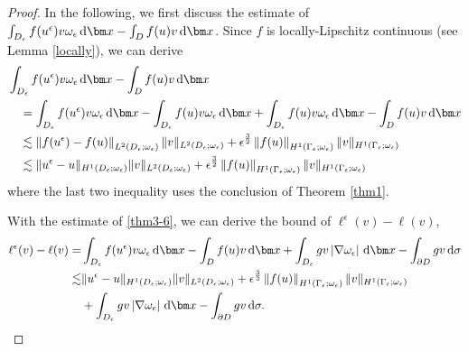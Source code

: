 \documentclass[3p,times]{elsarticle}
\numberwithin{equation}{section}
\newcommand{\dd}{\,{\rm d}}
\begin{document}
\begin{proof}
	In the following, we first discuss the estimate of $\int_{D_{\epsilon}}f(u^{\epsilon})v\omega_{\epsilon}\dd\bm x-\int_D f(u)v\dd\bm x$. Since $f$ is locally-Lipschitz continuous (see Lemma \ref{locally}), we can derive
	\begin{equation}
		\label{thm3-6}
		\begin{aligned}
			&\int_{D_{\epsilon}} f(u^{\epsilon})v\omega_{\epsilon}\dd\bm x - \int_D f(u)v\dd\bm x\\
			&\quad=\int_{D_{\epsilon}} f(u^{\epsilon})v\omega_{\epsilon}\dd\bm x-\int_{D_{\epsilon}} f(u)v\omega_{\epsilon}\dd\bm x+\int_{D_{\epsilon}}f(u)v\omega_{\epsilon}\dd\bm x-\int_D f(u)v\dd\bm x\\
			&\quad\lesssim \left\|f(u^{\epsilon})-f(u)\right\|_{L^2(D_{\epsilon};\omega_{\epsilon})}\|v\|_{L^2(D_{\epsilon};\omega_{\epsilon})}+\epsilon^{\frac 3 2}\left\|f(u)\right\|_{H^1(\Gamma_{\epsilon};\omega_{\epsilon})}\|v\|_{H^1(\Gamma_{\epsilon};\omega_{\epsilon})}\\
			&\quad\lesssim\|u^{\epsilon}-u\|_{H^1(D_{\epsilon};\omega_{\epsilon})}\|v\|_{L^2(D_{\epsilon};\omega_{\epsilon})}+\epsilon^{\frac 3 2}\left\|f(u)\right\|_{H^1(\Gamma_{\epsilon};\omega_{\epsilon})}\|v\|_{H^1(\Gamma_{\epsilon};\omega_{\epsilon})}
		\end{aligned}
	\end{equation}
	where the last two inequality uses the conclusion of Theorem \ref{thm1}.
	
	With the estimate of \eqref{thm3-6}, we can derive the bound of $\ell^{\epsilon}(v)-\ell(v)$, 
	\begin{equation}
		\label{thm3-7}
		\begin{aligned}
			\ell^{\epsilon}(v)-\ell(v)=& \int_{D_{\epsilon}}f(u^{\epsilon})v\omega_{\epsilon}\dd \bm x-\int_D f(u)v\dd \bm x+\int_{D_{\epsilon}}gv\left|\nabla\omega_{\epsilon}\right|\dd \bm x-\int_{\partial D}gv\dd \sigma\\
			\lesssim& \|u^{\epsilon}-u\|_{H^1(D_{\epsilon};\omega_{\epsilon})}\|v\|_{L^2(D_{\epsilon};\omega_{\epsilon})}+\epsilon^{\frac 3 2}\left\|f(u)\right\|_{H^1(\Gamma_{\epsilon};\omega_{\epsilon})}\|v\|_{H^1(\Gamma_{\epsilon};\omega_{\epsilon})}\\
			&+\int_{D_{\epsilon}} gv\left|\nabla\omega_{\epsilon}\right|\dd \bm x-\int_{\partial D}gv\dd \sigma.
		\end{aligned}
	\end{equation}
	

\end{proof}
\end{document}
